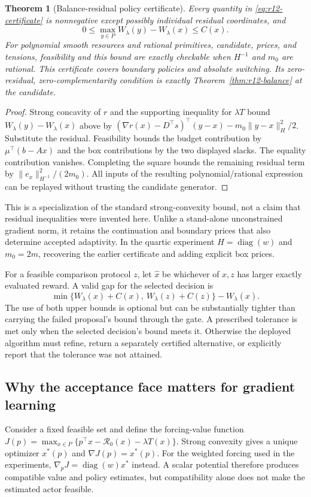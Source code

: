 \documentclass[11pt,letterpaper]{article}
\newtheorem{theorem}{Theorem}[section]
\theoremstyle{definition}
\newcommand{\1}{\mathbf 1}
\begin{document}
\begin{theorem}[Balance-residual policy certificate]\label{thm:r12-certificate}
Every quantity in \eqref{eq:r12-certificate} is nonnegative except possibly individual residual coordinates, and
\[
 0\leq \max_{y\in P}W_\lambda(y)-W_\lambda(x)\leq C(x).
\]
For polynomial smooth resources and rational primitives, candidate, prices, and tensions, feasibility and this bound are exactly checkable when $H^{-1}$ and $m_0$ are rational. This certificate covers boundary policies and absolute switching. Its zero-residual, zero-complementarity condition is exactly Theorem~\ref{thm:r12-balance} at the candidate.
\end{theorem}
\begin{proof}
Strong concavity of $r$ and the supporting inequality for $\lambda T$ bound $W_\lambda(y)-W_\lambda(x)$ above by
$(\nabla r(x)-D^\top s)^\top(y-x)-m_0\|y-x\|_H^2/2$.
Substitute the residual. Feasibility bounds the budget contribution by $\mu^\top(b-Ax)$ and the box contributions by the two displayed slacks. The equality contribution vanishes. Completing the square bounds the remaining residual term by $\|e_x\|_{H^{-1}}^2/(2m_0)$. All inputs of the resulting polynomial/rational expression can be replayed without trusting the candidate generator.
\end{proof}
This is a specialization of the standard strong-convexity bound, not a claim that residual inequalities were invented here. Unlike a stand-alone unconstrained gradient norm, it retains the continuation and boundary prices that also determine accepted adaptivity. In the quartic experiment $H=\operatorname{diag}(w)$ and $m_0=2m$, recovering the earlier certificate and adding explicit box prices.

For a feasible comparison protocol $z$, let $\widehat x$ be whichever of $x,z$ has larger exactly evaluated reward. A valid gap for the selected decision is
\begin{equation}\label{eq:r12-selected}
 \min\{W_\lambda(x)+C(x),\ W_\lambda(z)+C(z)\}
                  -W_\lambda(\widehat x).
\end{equation}
The use of both upper bounds is optional but can be substantially tighter than carrying the failed proposal's bound through the gate. A prescribed tolerance is met only when the selected decision's bound meets it. Otherwise the deployed algorithm must refine, return a separately certified alternative, or explicitly report that the tolerance was not attained.

\subsection{Why the acceptance face matters for gradient learning}
Consider a fixed feasible set and define the forcing-value function
$J(p)=\max_{x\in P}\{p^\top x-\mathcal R_0(x)-\lambda T(x)\}$.
Strong convexity gives a unique optimizer $x^*(p)$ and $\nabla J(p)=x^*(p)$. For the weighted forcing used in the experiments, $\nabla_pJ=\operatorname{diag}(w)x^*$ instead. A scalar potential therefore produces compatible value and policy estimates, but compatibility alone does not make the estimated actor feasible.
\end{document}
